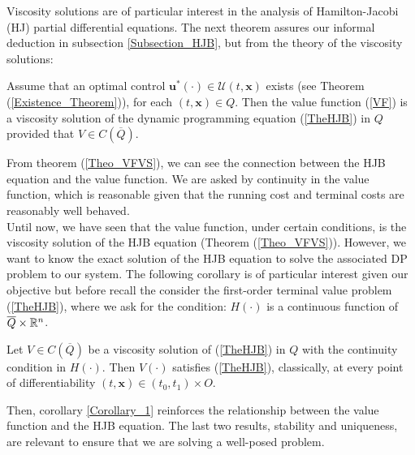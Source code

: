 Viscosity solutions are of particular interest in the analysis of Hamilton-Jacobi (HJ) partial differential equations. The next theorem assures our informal deduction in subsection \ref{Subsection_HJB}, but from the theory of the viscosity solutions:

\begin{theorem} \label{Theo_VFVS}
Assume that an optimal control $\bm{u}^*(\cdot)\in\mathcal{U}(t,\bm{x})$ exists (see Theorem (\ref{Existence_Theorem})), for each $(t,\bm{x})\in Q$. Then the value function (\ref{VF}) is a viscosity solution of the dynamic programming equation (\ref{TheHJB}) in $Q$ provided that $V\in C(\overline{Q})$.
\end{theorem}

From theorem (\ref{Theo_VFVS}), we can see the connection between the HJB equation and the value function. We are asked by continuity in the value function, which is reasonable given that the running cost and terminal costs are reasonably well behaved.\\

Until now, we have seen that the value function, under certain conditions, is the viscosity solution of the HJB equation (Theorem (\ref{Theo_VFVS})). However, we want to know the exact solution of the HJB equation to solve the associated DP problem to our system. The following corollary is of particular interest given our objective but before recall the consider the first-order terminal value problem (\ref{TheHJB}), where we ask for the condition: $H(\cdot)$ is a continuous function of $\overline{Q}\times\mathbb{R}^n$.

\begin{corollary}  \label{Corollary_1}
Let $V\in C(\overline{Q})$ be a viscosity solution of (\ref{TheHJB}) in $Q$ with the continuity condition in $H(\cdot)$. Then $V(\cdot)$ satisfies (\ref{TheHJB}), classically, at every point of differentiability $(t,\bm{x})\in(t_0,t_1)\times O$.
\end{corollary}

Then, corollary \ref{Corollary_1} reinforces the relationship between the value function and the HJB equation. The last two results, stability and uniqueness, are relevant to ensure that we are solving a well-posed problem.

